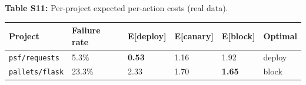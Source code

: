 \documentclass[10pt]{article}
\begin{document}
\noindent\textbf{Table S11:} Per-project expected per-action costs (real data).

\begin{table}[t]\centering\footnotesize\begin{tabular}{llllll}
\toprule\noalign{}
Project & Failure rate & E{[}deploy{]} & E{[}canary{]} & E{[}block{]} &
Optimal \\
\midrule\noalign{}
\bottomrule\noalign{}
\texttt{psf/requests} & 5.3\% & \textbf{0.53} & 1.16 & 1.92 & deploy \\
\texttt{pallets/flask} & 23.3\% & 2.33 & 1.70 & \textbf{1.65} & block \\
\end{tabular}\end{table}
\end{document}
